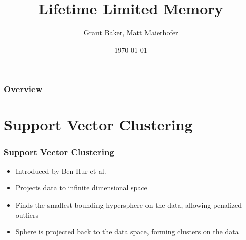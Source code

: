 \documentclass{beamer}
\title[LLM]{Lifetime Limited Memory} %
\author{Grant Baker, Matt Maierhofer} %
\institute[CU] %
{
University of Colorado \\ %
\medskip
\textit{} %
}
\date{\today} %
\begin{document}
\begin{frame}
\titlepage %
\end{frame}

\begin{frame}
\frametitle{Overview} %
\tableofcontents %
\end{frame}


\section{Support Vector Clustering} %


\begin{frame}
\frametitle{Support Vector Clustering}
\begin{itemize}
\item Introduced by Ben-Hur et al. \cite{SVC}
\item Projects data to infinite dimensional space
\item Finds the smallest bounding hypersphere on the data, allowing penalized outliers
\item Sphere is projected back to the data space, forming clusters on the data
\end{itemize}
\end{frame}
\end{document}

